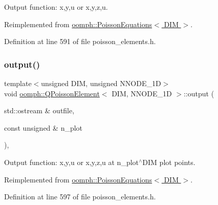Output function\+: x,y,u or x,y,z,u. 



Reimplemented from \hyperlink{classoomph_1_1PoissonEquations_a2417afb77d428846d7a1eada342ea8bb}{oomph\+::\+Poisson\+Equations$<$ D\+I\+M $>$}.



Definition at line 591 of file poisson\+\_\+elements.\+h.

\mbox{\label{classoomph_1_1QPoissonElement_a1b9e0f365936b175ed3405369f05b4af}} 
\subsubsection{\texorpdfstring{output()}{output()}\hspace{0.1cm}{\footnotesize\ttfamily [2/4]}}
{\footnotesize\ttfamily template$<$unsigned D\+IM, unsigned N\+N\+O\+D\+E\+\_\+1D$>$ \\
void \hyperlink{classoomph_1_1QPoissonElement}{oomph\+::\+Q\+Poisson\+Element}$<$ D\+IM, N\+N\+O\+D\+E\+\_\+1D $>$\+::output (\begin{DoxyParamCaption}\item[{std\+::ostream \&}]{outfile,  }\item[{const unsigned \&}]{n\+\_\+plot }\end{DoxyParamCaption})\hspace{0.3cm}{\ttfamily [inline]}, {\ttfamily [virtual]}}



Output function\+: x,y,u or x,y,z,u at n\+\_\+plot$^\wedge$\+D\+IM plot points. 



Reimplemented from \hyperlink{classoomph_1_1PoissonEquations_a6683dd0afc16bfddf4e79b6e0e449d43}{oomph\+::\+Poisson\+Equations$<$ D\+I\+M $>$}.



Definition at line 597 of file poisson\+\_\+elements.\+h.

\mbox{\label{classoomph_1_1QPoissonElement_adb597acc7de1a1b09eb25af0bce0fe9d}} 
